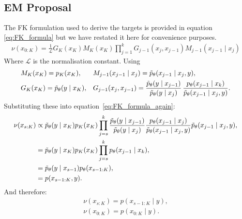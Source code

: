 \subsection{EM Proposal} \label{app:twisted_intermediate}
The FK formulation used to derive the targets is provided in equation \ref{eq:FK_formula} but we have restated it here for convenience purposes. 
\begin{align}
    \nu(x_{0:K}) = \frac{1}{\mathcal{L}} G_K(x_K) M_K(x_K) \prod_{j=1}^k G_{j-1}(x_j, x_{j-1}) M_{j-1}(x_{j-1} \mid x_{j})
    \label{eq:FK_formula_again}
\end{align}
Where $\mathcal{L}$ is the normalisation constant. Using 
\begin{align}
    &M_K(x_K) = p_K(x_K), &&  M_{j-1}(x_{j-1} \mid x_{j})= \Tilde{p}_{\theta}(x_{j-1} \mid x_{j}, y), \nonumber \\
    &G_K(x_K)= \Tilde{p}_{\theta}(y \mid x_{K}), &&G_{j-1}(x_j, x_{j-1}) = \frac{\Tilde{p}_{\theta}(y \mid x_{j-1})}{\Tilde{p}_{\theta}(y \mid x_{j})} \, \frac{p_\theta(x_{j-1} \mid x_{k})}{\Tilde{p}_{\theta}(x_{j-1} \mid x_{j}, y)}. \nonumber
\end{align}
Substituting these into equation~\ref{eq:FK_formula_again}: 
\begin{align}
    \nu(x_{s:K}) &\propto \Tilde{p}_{\theta}(y \mid x_{K}) p_K(x_K) \prod_{j=s}^k \frac{\Tilde{p}_{\theta}(y \mid x_{j-1})}{\Tilde{p}_{\theta}(y \mid x_{j})} \frac{p_\theta(x_{j-1} \mid x_{j})}{\Tilde{p}_{\theta}(x_{j-1} \mid x_{j}, y)} \Tilde{p}_{\theta}(x_{j-1} \mid x_{j}, y), \\
    &= \Tilde{p}_{\theta}(y \mid x_{K}) p_K(x_K) \prod_{j=s}^k p_\theta(x_{j-1} \mid x_{k}), \\
    &= \Tilde{p}_{\theta}(y \mid x_{s-1}) p_\theta(x_{s-1:K}), \\
    &= p(x_{s-1:K}, y). 
\end{align}
And therefore: 
\begin{align}
    \nu(x_{s:K}) = p(x_{s-1:K}\mid y), \\
    \nu(x_{0:K}) = p(x_{0:K}\mid y).
\end{align}


